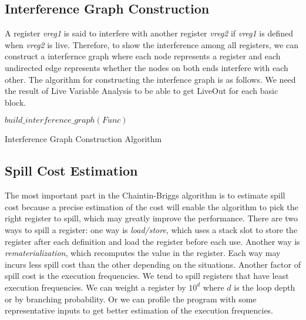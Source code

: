\documentclass{article}
\begin{document}
\subsection{Interference Graph Construction}
A register \emph{vreg1} is said to interfere with another register \emph{vreg2} if \emph{vreg1} is defined when \emph{vreg2} is live. Therefore, to show the interference among all registers, we can construct a interfernce graph where each node represents a register and each undirected edge represents whether the nodes on both ends interfere with each other. The algorithm for constructing the interfence graph is as follows. We need the result of Live Variable Analysis to be able to get LiveOut for each basic block.
\begin{algorithm}[h]
\scriptsize
{$build\_interference\_graph(Func)$}
\caption{Interference Graph Construction Algorithm}\label{alg:interferenceGraph}
\begin{algorithmic}[1]
  \ENDFOR
 \ENDFOR
{}
\end{algorithmic}
\end{algorithm}
\subsection{Spill Cost Estimation}
The most important part in the Chaintin-Briggs algorithm is to estimate spill cost because a precise estimation of the cost will enable the algorithm to pick the right register to spill, which may greatly improve the performance. There are two ways to spill a register: one way is \emph{load/store}, which uses a stack slot to store the register after each definition and load the register before each use. Another way is \emph{rematerialization}, which recomputes the value in the register. Each way may incurs less spill cost than the other depending on the situations. Another factor of spill cost is the execution frequencies. We tend to spill registers that have least execution frequencies. We can weight a register by $10^{d}$ where $d$ is the loop depth or by branching probability. Or we can profile the program with some representative inputs to get better estimation of the execution frequencies.
\end{document}
